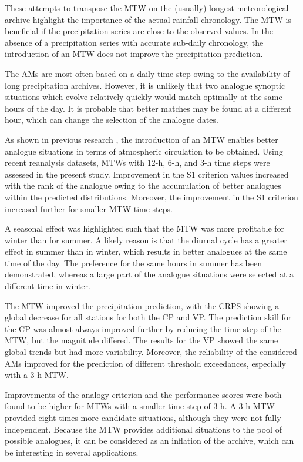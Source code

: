 \documentclass[hess, manuscript]{copernicus}
\begin{document}
	These attempts to transpose the MTW on the (usually) longest meteorological archive highlight the importance of the actual rainfall chronology. The MTW is beneficial if the precipitation series are close to the observed values. In the absence of a precipitation series with accurate sub-daily chronology, the introduction of an MTW does not improve the precipitation prediction.
	
	
	\conclusions  %
	\label{sec:conclusions}
	
	The AMs are most often based on a daily time step owing to the availability of long precipitation archives. However, it is unlikely that two analogue synoptic situations which evolve relatively quickly would match optimally at the same hours of the day. It is probable that better matches may be found at a different hour, which can change the selection of the analogue dates.
	
	As shown in previous research \citep{Finet2008}, the introduction of an MTW enables better analogue situations in terms of atmospheric circulation to be obtained. Using recent reanalysis datasets, MTWs with 12-h, 6-h, and 3-h time steps were assessed in the present study. Improvement in the S1 criterion values increased with the rank of the analogue owing to the accumulation of better analogues within the predicted distributions. Moreover, the improvement in the S1 criterion increased further for smaller MTW time steps.
	
	A seasonal effect was highlighted such that the MTW was more profitable for winter than for summer. A likely reason is that the diurnal cycle has a greater effect in summer than in winter, which results in better analogues at the same time of the day. The preference for the same hours in summer has been demonstrated, whereas a large part of the analogue situations were selected at a different time in winter.
	
	The MTW improved the precipitation prediction, with the CRPS showing a global decrease for all stations for both the CP and VP. The prediction skill for the CP was almost always improved further by reducing the time step of the MTW, but the magnitude differed. The results for the VP showed the same global trends but had more variability. Moreover, the reliability of the considered AMs improved for the prediction of different threshold exceedances, especially with a 3-h MTW.
	
	Improvements of the analogy criterion and the performance scores were both found to be higher for MTWs with a smaller time step of 3 h. A 3-h MTW provided eight times more candidate situations, although they were not fully independent. Because the MTW provides additional situations to the pool of possible analogues, it can be considered as an inflation of the archive, which can be interesting in several applications.
	
\end{document}
